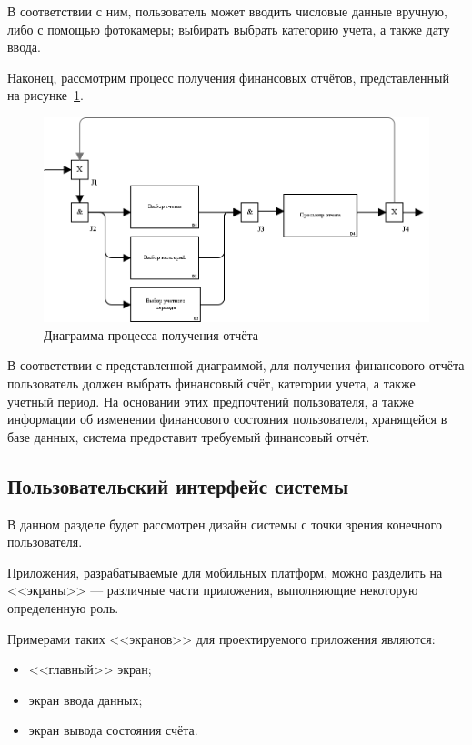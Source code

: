 В соответствии с ним, пользователь может вводить числовые данные
вручную, либо с помощью фотокамеры; выбирать выбрать категорию учета,
а также дату ввода.


\pagebreak
Наконец, рассмотрим процесс получения финансовых отчётов,
представленный на рисунке~\ref{fig:idef3_reports}.

\begin{figure}[h!]
  \centering
  \includegraphics[width=150mm]{pic/idef3_reports}
  \caption{Диаграмма процесса получения отчёта}
  \label{fig:idef3_reports}
\end{figure}

В соответствии с представленной диаграммой, для получения
финансового отчёта пользователь должен выбрать финансовый счёт,
категории учета, а также учетный период.
На основании этих предпочтений пользователя, а также информации
об изменении финансового состояния пользователя,
хранящейся в базе данных, система предоставит требуемый финансовый отчёт.

\pagebreak
\subsection{Пользовательский интерфейс системы}

В данном разделе будет рассмотрен дизайн системы с точки зрения
конечного пользователя.

Приложения, разрабатываемые для мобильных платформ, можно разделить
на <<экраны>> --- различные части приложения, выполняющие некоторую
определенную роль.

Примерами таких <<экранов>> для проектируемого приложения являются:
\begin{itemize}
\item <<главный>> экран;
\item экран ввода данных;
\item экран вывода состояния счёта.
\end{itemize}

